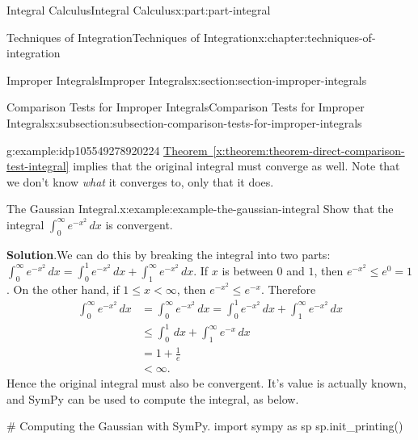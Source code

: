 \documentclass[twoside,10pt,]{book}
\newcommand{\blocktitlefont}{\relax}
\newcommand{\xreffont}{\relax}
\numberwithin{equation}{part}
\newcommand{\lt}{<}
\begin{document}
\begin{partptx}{Integral Calculus}{}{Integral Calculus}{}{}{x:part:part-integral}
\begin{chapterptx}{Techniques of Integration}{}{Techniques of Integration}{}{}{x:chapter:techniques-of-integration}
\begin{sectionptx}{Improper Integrals}{}{Improper Integrals}{}{}{x:section:section-improper-integrals}
\begin{subsectionptx}{Comparison Tests for Improper Integrals}{}{Comparison Tests for Improper Integrals}{}{}{x:subsection:subsection-comparison-tests-for-improper-integrals}
\begin{example}{}{g:example:idp105549278920224}
\hyperref[x:theorem:theorem-direct-comparison-test-integral]{Theorem~{\xreffont\ref{x:theorem:theorem-direct-comparison-test-integral}}} implies that the original integral must converge as well. Note that we don't know \emph{what} it converges to, only that it does.%
\end{example}
\begin{example}{The Gaussian Integral.}{x:example:example-the-gaussian-integral}%
Show that the integral \(\int_{0}^{\infty}e^{-x^{2}}\,dx\) is convergent.%
\par\smallskip%
\noindent\textbf{\blocktitlefont Solution}.\hypertarget{g:solution:idp105549278924576}{}\quad{}We can do this by breaking the integral into two parts: \(\int_{0}^{\infty}e^{-x^{2}}\,dx = \int_{0}^{1}e^{-x^{2}}\,dx + \int_{1}^{\infty}e^{-x^{2}}\,dx.\) If \(x\) is between \(0\) and \(1\), then \(e^{-x^{2}} \leq e^{0} = 1\). On the other hand, if \(1\leq x\lt \infty\), then \(e^{-x^{2}} \leq e^{-x}\). Therefore%
\begin{align*}
\int_{0}^{\infty}e^{-x^{2}}\,dx & = \int_{0}^{\infty}e^{-x^{2}}\,dx = \int_{0}^{1}e^{-x^{2}}\,dx + \int_{1}^{\infty}e^{-x^{2}}\,dx\\
& \leq \int_{0}^{1}\,dx + \int_{1}^{\infty}e^{-x}\,dx \\
& = 1 + \frac{1}{e} \\
& \lt \infty.
\end{align*}
Hence the original integral must also be convergent. It's value is actually known, and SymPy can be used to compute the integral, as below.%
\end{example}
\begin{sageinput}
# Computing the Gaussian with SymPy.
import sympy as sp
sp.init_printing()


\end{sageinput}
\end{subsectionptx}
\end{sectionptx}
\end{chapterptx}
\end{partptx}
\end{document}
